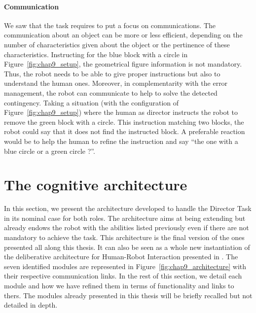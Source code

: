 \paragraph{Communication} We saw that the task requires to put a focus on communications. The communication about an object can be more or less efficient, depending on the number of characteristics given about the object or the pertinence of these characteristics. Instructing for the blue block with a circle in Figure~\ref{fig:chap9_setup}, the geometrical figure information is not mandatory. Thus, the robot needs to be able to give proper instructions but also to understand the human ones. Moreover, in complementarity with the error management, the robot can communicate to help to solve the detected contingency. Taking a situation (with the configuration of Figure~\ref{fig:chap9_setup}) where the human as director instructs the robot to remove the green block with a circle. This instruction matching two blocks, the robot could say that it does not find the instructed block. A preferable reaction would be to help the human to refine the instruction and say ``the one with a blue circle or a green circle ?''.

\section{The cognitive architecture}
\label{sec:9_3}

In this section, we present the architecture developed to handle the Director Task in its nominal case for both roles. The architecture aims at being extending but already endows the robot with the abilities listed previously even if there are not mandatory to achieve the task. This architecture is the final version of the ones presented all along this thesis. It can also be seen as a whole new instantiation of the deliberative architecture for Human-Robot Interaction presented in \cite{lemaignan_2017_artificial}. The seven identified modules are represented in Figure~\ref{fig:chap9_architecture} with their respective communication links. In the rest of this section, we detail each module and how we have refined them in terms of functionality and links to thers. The modules already presented in this thesis will be briefly recalled but not detailed in depth.

